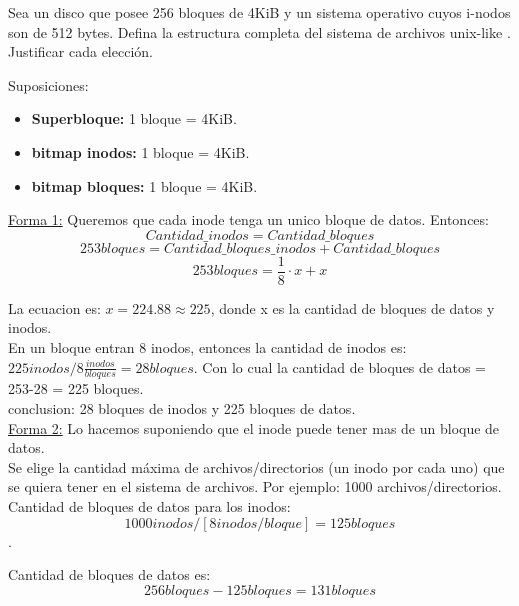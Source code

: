 \documentclass[../main.tex]{subfiles}
\begin{document}
    \begin{exercise}
        Sea un disco que posee 256 bloques de 4KiB y un sistema operativo cuyos i-nodos son de 512 bytes. Defina la estructura completa del sistema de archivos unix-like . Justificar cada elección.
        \newpage
        \begin{answer} Suposiciones:
            \begin{itemize}
                \item \textbf{Superbloque:} 1 bloque = 4KiB.
                \item \textbf{bitmap inodos:} 1 bloque = 4KiB.
                \item \textbf{bitmap bloques:} 1 bloque = 4KiB.
            \end{itemize}

            \underline{Forma 1:} Queremos que cada inode tenga un unico bloque de datos.
            Entonces:
            $$ Cantidad\_inodos = Cantidad\_bloques$$
            $$ 253 bloques = Cantidad\_bloques\_inodos + Cantidad\_bloques$$
            $$ 253 bloques = \frac{1}{8} \cdot x + x$$

            La ecuacion es: $x = 224.88 \approx 225$, donde x es la cantidad de bloques de datos y inodos.\\

            En un bloque entran 8 inodos, entonces la cantidad de inodos es: $225 inodos / 8 \frac{inodos}{bloques} = 28 bloques$. Con lo cual la cantidad de bloques de datos = 253-28 = 225 bloques. \\
            
            conclusion: 28 bloques de inodos y 225 bloques de datos.\\

            \underline{Forma 2:} Lo hacemos suponiendo que el inode puede tener mas de un bloque de datos.\\

            Se elige la cantidad máxima de archivos/directorios (un inodo por cada uno) que se quiera tener en el sistema de archivos. Por ejemplo: 1000 archivos/directorios.\\
            
            Cantidad de bloques de datos para los inodos: 
            $$1000 inodos / [8 inodos / bloque] = 125 bloques$$.

            Cantidad de bloques de datos es: 
            $$256 bloques - 125 bloques = 131 bloques$$
        \end{answer}
    \end{exercise}
\end{document}
